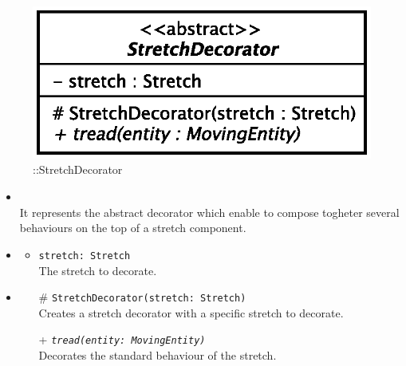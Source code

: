 \begin{figure}[h]
\centering
\includegraphics[scale=0.6,keepaspectratio]{images/solution/app/backend/stretch_decorator.eps}
\caption{\pReactiveComponentStretchDecoration::StretchDecorator}
\label{fig:sd-app-stretch_decorator}
\end{figure}
\FloatBarrier
\begin{itemize}
  \item \textbf{\descr} \\
    It represents the abstract decorator which enable to compose togheter several
behaviours on the top of a stretch component. 
  \item \textbf{\attrs}
  \begin{itemize}
    \item \texttt{stretch: Stretch} \\
The stretch to decorate.
  \end{itemize}
  \item \textbf{\ops}
   \begin{itemize} 
   \item[\#] \texttt{StretchDecorator(stretch: Stretch)} \\
Creates a stretch decorator with a specific stretch to decorate.
    \item[+] \texttt{\textit{tread(entity: MovingEntity)}} \\
Decorates the standard behaviour of the stretch.  
  \end{itemize}
\end{itemize}
